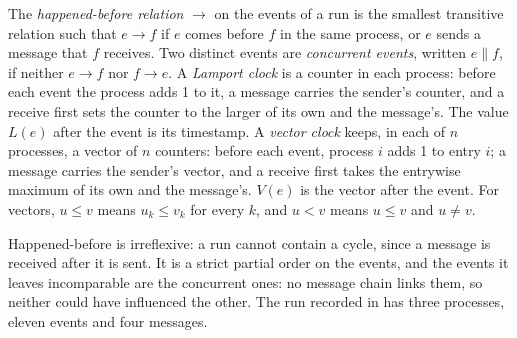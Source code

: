 \begin{definition}\label{def:b3:distributed-systems:clocks}
The \emph{happened-before relation} $\to$ on the events of a run is the smallest transitive relation such that $e \to f$ if $e$ comes before $f$ in the same process, or $e$ sends a message that $f$ receives. Two distinct events are \emph{concurrent events}, written $e \parallel f$, if neither $e \to f$ nor $f \to e$. A \emph{Lamport clock} is a counter in each process: before each event the process adds 1 to it, a message carries the sender's counter, and a receive first sets the counter to the larger of its own and the message's. The value $L(e)$ after the event is its timestamp. A \emph{vector clock} keeps, in each of $n$ processes, a vector of $n$ counters: before each event, process $i$ adds 1 to entry $i$; a message carries the sender's vector, and a receive first takes the entrywise maximum of its own and the message's. $V(e)$ is the vector after the event. For vectors, $u \le v$ means $u_k \le v_k$ for every $k$, and $u < v$ means $u \le v$ and $u \ne v$.
\end{definition}

Happened-before is irreflexive: a run cannot contain a cycle, since a message is received after it is sent. It is a strict partial order on the events, and the events it leaves incomparable are the concurrent ones: no message chain links them, so neither could have influenced the other. The run recorded in  has three processes, eleven events and four messages.

\label{lst:b3:distributed-systems:lamport}

\label{out:b3:distributed-systems:lamport}

